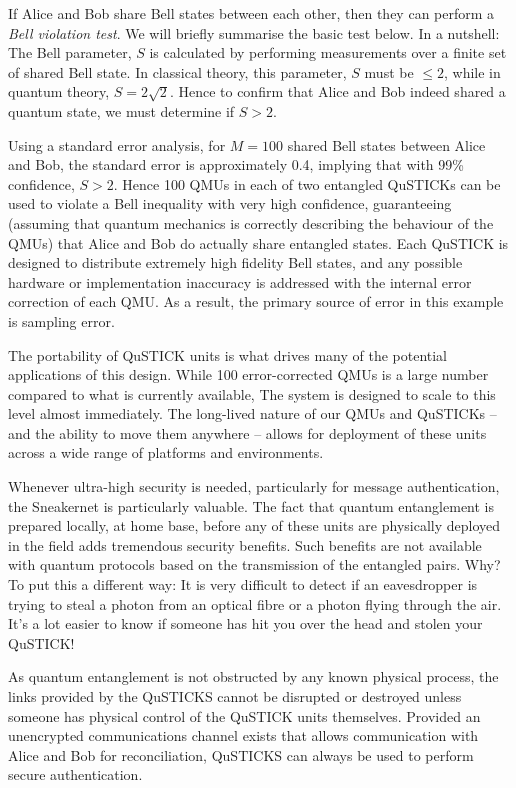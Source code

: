 \documentclass[twocolumn, aps, rmp, amsmath, amssymb, nofootinbib, superscriptaddress, longbibliography, floatfix, table-of-contents, eqsecnum]{revtex4-2}
\begin{document}
If Alice and Bob share Bell states between each other, then they can perform a \textit{Bell violation test}. We will briefly summarise the basic test below. In a nutshell: The Bell parameter, $S$ is calculated by performing measurements over a finite set of shared Bell state. In classical theory, this parameter, $S$ must be $\leq 2$, while in quantum theory, $S=2\sqrt{2}$. Hence to confirm that Alice and Bob indeed shared a quantum state, we must determine if $S>2$.

Using a standard error analysis, for $M = 100$ shared Bell states between Alice and Bob, the standard error is approximately 0.4, implying that with 99\% confidence, $S > 2$. Hence 100 QMUs in each of two entangled QuSTICKs can be used to violate a Bell inequality with very high confidence, guaranteeing (assuming that quantum mechanics is correctly describing the behaviour of the QMUs) that Alice and Bob do actually share entangled states. Each QuSTICK is designed to distribute extremely high fidelity Bell states, and any possible hardware or implementation inaccuracy is addressed with the internal error correction of each QMU. As a result, the primary source of error in this example is sampling error.

The portability of QuSTICK units is what drives many of the potential applications of this design. While 100 error-corrected QMUs is a large number compared to what is currently available, The system is designed to scale to this level almost immediately. The long-lived nature of our QMUs and QuSTICKs -- and the ability to move them anywhere -- allows for deployment of these units across a wide range of platforms and environments. 

Whenever ultra-high security is needed, particularly for message authentication, the Sneakernet is particularly valuable. The fact that quantum entanglement is prepared locally, at home base, before any of these units are physically deployed in the field adds tremendous security benefits. Such benefits are not available with quantum protocols based on the transmission of the entangled pairs. Why? To put this a different way: It is very difficult to detect if an eavesdropper is trying to steal a photon from an optical fibre or a photon flying through the air. It's a lot easier to know if someone has hit you over the head and stolen your QuSTICK!

As quantum entanglement is not obstructed by any known physical process, the links provided by the QuSTICKS cannot be disrupted or destroyed unless someone has physical control of the QuSTICK units themselves. Provided an unencrypted communications channel exists that allows communication with Alice and Bob for reconciliation, QuSTICKS can always be used to perform secure authentication. 
\end{document}
